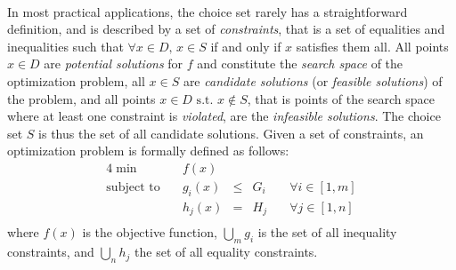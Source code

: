 	\paragraph{}
	In most practical applications, the choice set rarely has a straightforward definition, and is described by a set of \emph{constraints}, that is a set of equalities and inequalities such that $\forall x\in D,\,x\in S$ if and only if $x$ satisfies them all.
	All points $x\in D$ are \emph{potential solutions} for $f$ and constitute the \emph{search space} of the optimization problem, all $x\in S$ are \emph{candidate solutions} (or \emph{feasible solutions}) of the problem, and all points $x\in D\text{ s.t. }x\notin S$, that is points of the search space where at least one constraint is \emph{violated}, are the \emph{infeasible solutions}.
	The choice set $S$ is thus the set of all candidate solutions.
	Given a set of constraints, an optimization problem is formally defined as follows: %
	\begin{alignat*}{4}
		\min\quad& f(x) & & &\\
		\text{subject to}\quad& g_i(x) & \leq & G_i\quad & \forall i \in [1, m] \\
		                      & h_j(x) &   =  & H_j\quad & \forall j \in [1, n] \\
	\end{alignat*}
	where $f(x)$ is the objective function, $\bigcup\limits_{m}{g_i}$ is the set of all inequality constraints, and $\bigcup\limits_{n}{h_j}$ the set of all equality constraints. %

